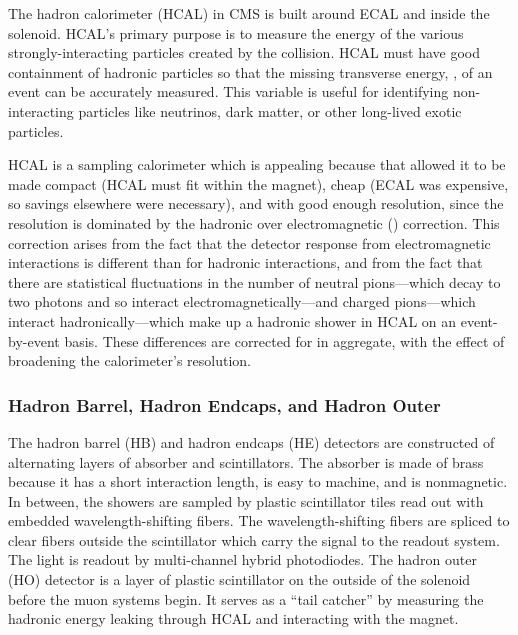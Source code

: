 The hadron calorimeter (HCAL) in CMS is built around ECAL and inside the
solenoid. HCAL's primary purpose is to measure the energy of the various
strongly-interacting particles created by the collision. HCAL must have good
containment of hadronic particles so that the missing transverse energy, \MET,
of an event can be accurately measured. This variable is useful for identifying
non-interacting particles like neutrinos, dark matter, or other long-lived
exotic particles.

HCAL is a sampling calorimeter which is appealing because that allowed it to be
made compact (HCAL must fit within the magnet), cheap (ECAL was expensive, so
savings elsewhere were necessary), and with good enough resolution, since the
resolution is dominated by the hadronic over electromagnetic (\HOverE)
correction. This correction arises from the fact that the detector response
from electromagnetic interactions is different than for hadronic interactions,
and from the fact that there are statistical fluctuations in the number of
neutral pions---which decay to two photons and so interact
electromagnetically---and charged pions---which interact hadronically---which
make up a hadronic shower in HCAL on an event-by-event basis. These differences
are corrected for in aggregate, with the effect of broadening the calorimeter's
resolution.

\subsubsection{Hadron Barrel, Hadron Endcaps, and Hadron Outer}

The hadron barrel (HB) and hadron endcaps (HE) detectors are constructed of
alternating layers of absorber and scintillators. The absorber is made of brass
because it has a short interaction length, is easy to machine, and is
nonmagnetic. In between, the showers are sampled by plastic scintillator tiles
read out with embedded wavelength-shifting fibers. The wavelength-shifting
fibers are spliced to clear fibers outside the scintillator which carry the
signal to the readout system. The light is readout by multi-channel hybrid
photodiodes. The hadron outer (HO) detector is a layer of plastic scintillator
on the outside of the solenoid before the muon systems begin. It serves as a
``tail catcher'' by measuring the hadronic energy leaking through HCAL and
interacting with the magnet.


